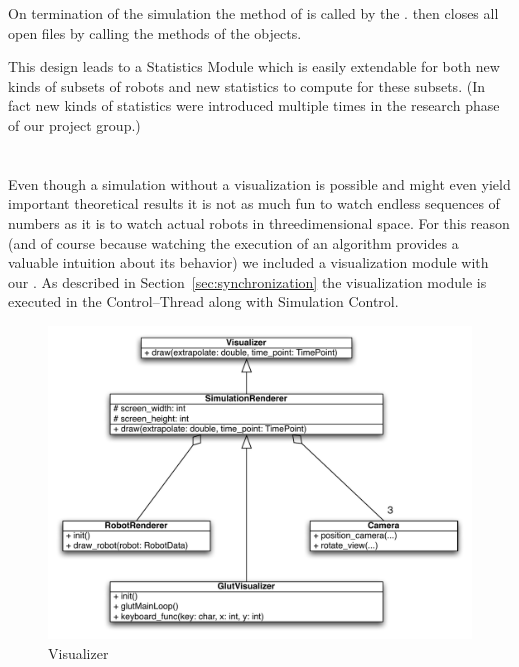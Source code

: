 \noindent
On termination of the simulation the  method of  is called by the .  then closes all open files by calling the  methods of the  objects.\smallskip

\noindent
This design leads to a  Statistics Module which is easily extendable for both new kinds of subsets of robots and new statistics to compute for these subsets. (In fact new kinds of statistics were introduced multiple times in the research phase of our project group.)


\section{}\label{sec:visualizer}

Even though a simulation without a visualization is possible and might even yield important theoretical results it is not as much fun to watch endless sequences of numbers as it is to watch actual robots in threedimensional space. For this reason (and of course because watching the execution of an algorithm provides a valuable intuition about its behavior) we included a visualization module with our \RSS. As described in Section~\ref{sec:synchronization} the visualization module is executed in the Control--Thread along with Simulation Control.\smallskip

\begin{figure}
\centering\includegraphics[width=0.75\linewidth]{chapter_reference_fig/visualizer}
\caption{Visualizer}\label{fig:visualizer}
\end{figure}

